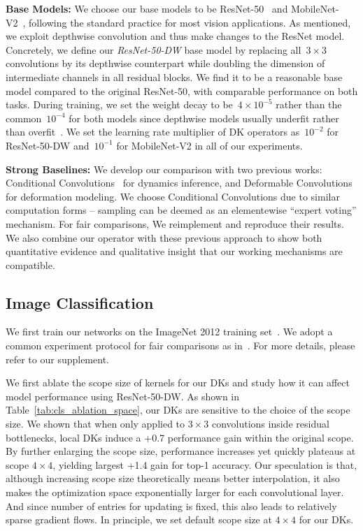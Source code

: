 \documentclass{article} \usepackage{iclr2020_conference, times}
\newcommand{\bfsection}[1]{\noindent\textbf{#1:}}
\begin{document}
\bfsection{Base Models}
We choose our base models to be ResNet-50~\citep{he2016deep} and
MobileNet-V2~\citep{sandler2018mobilenetv2}, following the standard practice
for most vision applications.
As mentioned, we exploit depthwise convolution and thus make changes to the
ResNet model.
Concretely, we define our \textit{ResNet-50-DW} base model by replacing all~$3
\times 3$ convolutions by its depthwise counterpart while doubling the
dimension of intermediate channels in all residual blocks.
We find it to be a reasonable base model compared to the original ResNet-50,
with comparable performance on both tasks.
During training, we set the weight decay to be~$4 \times 10^{-5}$ rather than
the common~$10^{-4}$ for both models since depthwise models usually underfit rather
than overfit~\citep{xie2017aggregated,howard2017mobilenets,hu2018squeeze}.
We set the learning rate multiplier of DK operators as~$10^{-2}$ for
ResNet-50-DW and~$10^{-1}$ for MobileNet-V2 in all of our experiments.

\bfsection{Strong Baselines}
We develop our comparison with two previous works: Conditional
Convolutions~\citep{yang2019soft} for dynamics inference, and Deformable
Convolutions~\citep{dai2017deformable,zhu2019deformable} for deformation
modeling.
We choose Conditional Convolutions due to similar computation forms --
sampling can be deemed as an elementewise ``expert voting'' mechanism.
For fair comparisons, We reimplement and reproduce their results.
We also combine our operator with these previous approach to show
both quantitative evidence and qualitative insight that our working mechanisms
are compatible.

\subsection{Image Classification} \label{sec:cls}

We first train our networks on the ImageNet 2012 training
set~\citep{deng2009imagenet}.
We adopt a common experiment protocol for fair comparisons as in~\citet{goyal2017accurate,loshchilov2016sgdr}.
For more details, please refer to our supplement.

We first ablate the scope size of kernels for our DKs and study how it can
affect model performance using ResNet-50-DW.
As shown in Table~\ref{tab:cls_ablation_space}, our DKs are sensitive to the
choice of the scope size.
We shown that when only applied to $3 \times 3$ convolutions inside residual
bottlenecks, local DKs induce a +0.7 performance gain within the original
scope.
By further enlarging the scope size, performance increases yet quickly plateaus
at scope $4 \times 4$, yielding largest +1.4 gain for top-1 accuracy.
Our speculation is that, although increasing scope size theoretically means
better interpolation, it also makes the optimization space exponentially larger
for each convolutional layer.
And since number of entries for updating is fixed, this also leads to
relatively sparse gradient flows.
In principle, we set default scope size at $4 \times 4$ for our DKs.
\end{document}
